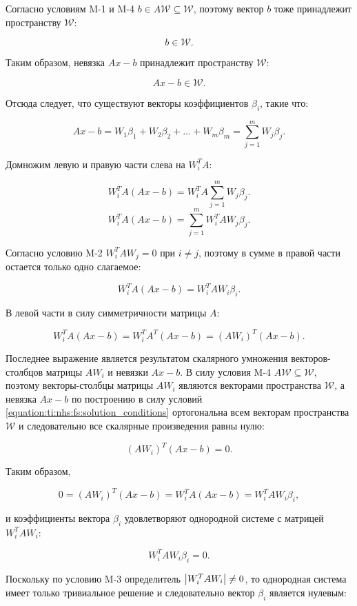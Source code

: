 Согласно условиям M-1 и M-4 $b \in A \mathcal W \subseteq \mathcal W$, поэтому вектор $b$ тоже принадлежит пространству $\mathcal W$:

$$
	b \in \mathcal W.
$$

Таким образом, невязка $Ax - b$ принадлежит пространству $\mathcal W$:

$$
	Ax - b \in \mathcal W.
$$

Отсюда следует, что существуют векторы коэффициентов $\beta_i$, такие что:

\begin{equation} \label{equation:ti:nhs:fs:residual_representation}
	Ax - b = W_1 \beta_1 + W_2 \beta_2 + \dots + W_m \beta_m = \sum_{j=1}^m W_j \beta_j.
\end{equation}

Домножим левую и правую части слева на $W_i^T A$:

$$
	W_i^T A ( Ax - b ) = W_i^T A \sum_{j=1}^m W_j \beta_j.
$$
$$
	W_i^T A ( Ax - b ) = \sum_{j=1}^m W_i^T A W_j \beta_j.
$$

Согласно условию M-2 $W_i^T A W_j = 0$ при $i \neq j$, поэтому в сумме в правой части остается только одно слагаемое:

$$
	W_i^T A ( Ax - b ) = W_i^T A W_i \beta_i.
$$

В левой части в силу симметричности матрицы $A$:

$$
	W_i^T A ( Ax - b ) = W_i^T A^T ( Ax - b ) = ( A W_i )^T ( Ax - b ).
$$

Последнее выражение является результатом скалярного умножения векторов-столбцов матрицы $A W_i$ и невязки $Ax - b$. В силу условия
M-4 $A \mathcal W \subseteq \mathcal W$, поэтому векторы-столбцы матрицы $A W_i$ являются векторами пространства $\mathcal W$,
а невязка $Ax - b$ по построению в силу условий \ref{equation:ti:nhs:fs:solution_conditions} ортогональна всем векторам пространства
$\mathcal W$ и следовательно все скалярные произведения равны нулю:

$$
	( A W_i )^T ( Ax - b ) = 0.
$$

Таким образом,

$$
	0 = ( A W_i )^T ( Ax - b ) = W_i^T A ( Ax - b ) = W_i^T A W_i \beta_i,
$$

и коэффициенты вектора $\beta_i$ удовлетворяют однородной системе с матрицей $W_i^T A W_i$:

$$
	W_i^T A W_i \beta_i = 0.
$$

Поскольку по условию M-3 определитель $\left | W_i^T A W_i \right | \ne 0$, то однородная система имеет только тривиальное решение и
следовательно вектор $\beta_i$ является нулевым:

